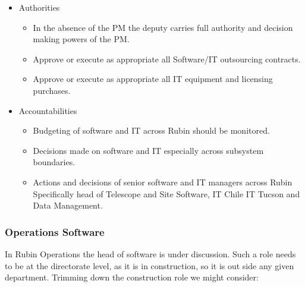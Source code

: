 \begin{itemize}
\begin{itemize}
\end{itemize}
\item Authorities
\begin{itemize}
\item  In the absence of the PM the deputy carries full authority and decision making powers
of the PM.
\item Approve or execute as appropriate all Software/IT outsourcing contracts.
\item Approve or execute as appropriate all IT equipment and licensing purchases.
\end{itemize}
\item Accountabilities
\begin{itemize}
\item Budgeting of software and IT across Rubin should be monitored.
\item Decisions made on software and IT especially across subsystem boundaries.
\item Actions and decisions of senior software and IT managers across Rubin Specifically head of Telescope and Site Software, IT Chile IT Tucson and Data Management.

\end{itemize}
\end{itemize}


\subsubsection{Operations Software} \label{sec:opssw}

In Rubin Operations the  head of software is under  discussion.
Such a role needs to be at the directorate level, as it is in construction, so it is out side any given department.
Trimming down the construction role we might consider:

